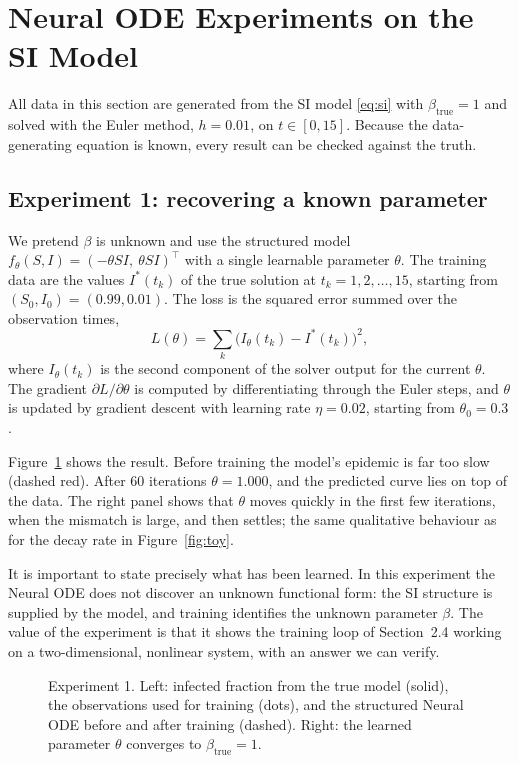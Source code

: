 \documentclass[11pt,a4paper]{article}
\newcommand{\figph}[2]{%
  \fbox{\parbox[c][3.2cm][c]{\dimexpr#1-2\fboxsep-2\fboxrule\relax}{%
    \centering\small\ttfamily [figure: #2]}}}
\begin{document}
\section{Neural ODE Experiments on the SI Model}
\label{sec:si-experiments}

All data in this section are generated from the SI model \eqref{eq:si} with
$\beta_{\text{true}} = 1$ and solved with the Euler method, $h = 0.01$, on
$t\in[0,15]$. Because the data-generating equation is known, every result can be
checked against the truth.

\subsection{Experiment 1: recovering a known parameter}
\label{sec:exp1}

We pretend $\beta$ is unknown and use the structured model
$f_\theta(S,I) = (-\theta SI,\ \theta SI)^\top$ with a single learnable parameter
$\theta$. The training data are the values $I^*(t_k)$ of the true solution at
$t_k = 1,2,\dots,15$, starting from $(S_0,I_0) = (0.99,0.01)$. The loss is the
squared error summed over the observation times,
\[
  L(\theta) = \sum_{k} \bigl(I_\theta(t_k) - I^*(t_k)\bigr)^2,
\]
where $I_\theta(t_k)$ is the second component of the solver output for the
current $\theta$. The gradient $\partial L/\partial\theta$ is computed by
differentiating through the Euler steps, and $\theta$ is updated by gradient
descent with learning rate $\eta = 0.02$, starting from $\theta_0 = 0.3$.

Figure~\ref{fig:si-beta} shows the result. Before training the model's epidemic
is far too slow (dashed red). After 60 iterations $\theta = 1.000$, and the
predicted curve lies on top of the data. The right panel shows that $\theta$
moves quickly in the first few iterations, when the mismatch is large, and then
settles; the same qualitative behaviour as for the decay rate in
Figure~\ref{fig:toy}.

It is important to state precisely what has been learned. In this experiment the
Neural ODE does not discover an unknown functional form: the SI structure is
supplied by the model, and training identifies the unknown parameter $\beta$.
The value of the experiment is that it shows the training loop of Section~2.4
working on a two-dimensional, nonlinear system, with an answer we can verify.

\begin{figure}[h]
  \centering
  \figph{0.95\textwidth}{fig\_si\_beta\_recovery}
  \caption{Experiment 1. Left: infected fraction from the true model (solid),
  the observations used for training (dots), and the structured Neural ODE
  before and after training (dashed). Right: the learned parameter $\theta$
  converges to $\beta_{\text{true}}=1$.}
  \label{fig:si-beta}
\end{figure}
\end{document}
